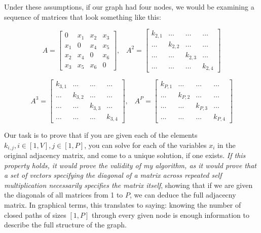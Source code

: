 \documentclass[a4paper,12pt]{article}
\begin{document}
Under these assumptions, if our graph had four nodes, we would be examining 
a sequence of matrices that look something like this:

\[ 
A = 
\left[\begin{array}{cccc}
0 & x_1 & x_2 & x_3 \\
x_1 & 0 & x_4 & x_5 \\
x_2 & x_4 & 0 & x_6 \\
x_3 & x_5 & x_6 & 0
 \end{array} \right],\;\;\;
A^2 =
 \left[\begin{array}{cccc}
k_{2,1} & \ldots & \ldots & \ldots \\
\ldots & k_{2,2} & \ldots & \ldots \\
\ldots & \ldots & k_{2,3} & \ldots \\
\ldots & \ldots & \ldots & k_{2,4}
 \end{array} \right] 
\]

\[ 
A^3 = 
 \left[\begin{array}{cccc}
k_{3,1} & \ldots & \ldots & \ldots \\
\ldots & k_{3,2} & \ldots & \ldots \\
\ldots & \ldots & k_{3,3} & \ldots \\
\ldots & \ldots & \ldots & k_{3,4}
 \end{array} \right] ,\;\;\;
A^P =
 \left[\begin{array}{cccc}
k_{P,1} & \ldots & \ldots & \ldots \\
\ldots & k_{P,2} & \ldots & \ldots \\
\ldots & \ldots & k_{P,3} & \ldots \\
\ldots & \ldots & \ldots & k_{P,4}
 \end{array} \right] 
\]


Our task is to prove that if you are given each of the elements \(k_{i,j}, i \in [1, V], j \in [1, P]\),
you can solve for each of the variables \(x_i\) in the original adjacency matrix, and come to a unique solution, if one exists. \emph{If this
property holds, it would prove the validity of my algorithm, as it would prove that a set of vectors
specifying the diagonal of a matrix across repeated self multiplication necessarily specifies the 
matrix itself}, showing that if we are given the diagonals of all matrices from 1 to \(P\), we can
deduce the full adjacecny matrix.  In graphical terms, this translates to saying: knowing the number
of closed paths of sizes \([1, P]\) through every given node is enough information to describe the
full structure of the graph.
\end{document}
